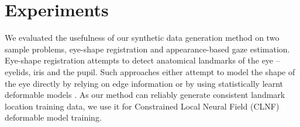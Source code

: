 
\section{Experiments}




% 


We evaluated the usefulness of our synthetic data generation method on two sample problems, eye-shape registration and appearance-based gaze estimation.
%
Eye-shape registration attempts to detect anatomical landmarks of the eye -- eyelids, iris and the pupil. 
Such approaches either attempt to model the shape of the eye directly by relying on edge information \cite{wood2014eyetab, swirski2012robust} or by using statistically learnt deformable models \cite{alabort2014statistically}. 
As our method can reliably generate consistent landmark location training data, we use it for Constrained Local Neural Field (CLNF) \cite{baltrusaitis2013constrained} deformable model training.

